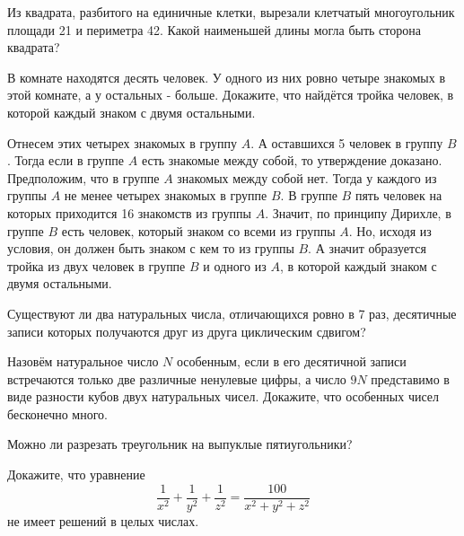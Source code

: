 \documentclass[11pt, a4paper]{common/document_template}
\begin{document}
\begin{exercise}[86]
Из квадрата, разбитого на единичные клетки, вырезали клетчатый многоугольник
площади 21 и периметра 42. Какой наименьшей длины могла быть сторона квадрата?
\end{exercise}

\begin{exercise}[106]
В комнате находятся десять человек. У одного из них ровно четыре знакомых в
этой комнате, а у остальных - больше. Докажите, что найдётся тройка человек, в которой
каждый знаком с двумя остальными.
\end{exercise}

\begin{Solution}
Отнесем этих четырех знакомых в группу $A$. А оставшихся 5 человек в группу $B$. 
Тогда если в группе $A$ есть знакомые между собой, то утверждение доказано.
Предположим, что в группе $A$ знакомых между собой нет. Тогда у каждого из группы $A$ не менее четырех знакомых в группе $B$.
В группе $B$ пять человек на которых приходится 16 знакомств из группы $A$. Значит, по принципу Дирихле, 
в группе $B$ есть человек, который знаком со всеми из группы $A$. Но, исходя из условия, он должен быть знаком с кем то из группы $B$.
А значит образуется тройка из двух человек в группе $B$ и одного из $A$, в  которой каждый знаком с двумя остальными.
\end{Solution}

\begin{exercise}[118]
Существуют ли два натуральных числа, отличающихся ровно в 7 раз, десятичные
записи которых получаются друг из друга циклическим сдвигом?
\end{exercise}

\begin{exercise}[123]
Назовём натуральное число $N$ особенным, если в его десятичной записи
встречаются только две различные ненулевые цифры, а число $9N$ представимо в виде
разности кубов двух натуральных чисел. Докажите, что особенных чисел бесконечно
много.
\end{exercise}

\begin{exercise}[125]
Можно ли разрезать треугольник на выпуклые пятиугольники?
\end{exercise}

\begin{exercise}[129]
Докажите, что уравнение
$$
\frac{1}{x^{2}} + \frac{1}{y^{2}} + \frac{1}{z^{2}} = \frac{100}{x^{2} + y^{2} + z^{2}}
$$
не имеет решений в целых числах.
\end{exercise}
\end{document}
